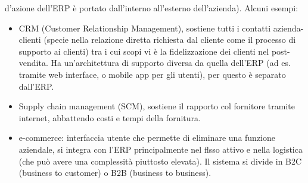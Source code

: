 d'azione dell'ERP \`e portato dall'interno all'esterno dell'azienda). Alcuni esempi:
\begin{itemize}
  \item CRM (Customer Relationship Management), sostiene tutti i contatti azienda-clienti (specie nella relazione diretta richiesta dal cliente
  come il processo di supporto ai clienti) tra i cui scopi vi \`e la fidelizzazione dei clienti
  nel post-vendita. Ha un'architettura di supporto diversa da quella dell'ERP (ad es. tramite web interface, o mobile app per gli utenti),
  per questo \`e separato dall'ERP.
  \item Supply chain management (SCM), sostiene il rapporto col fornitore tramite internet,
  abbattendo costi e tempi della fornitura.
  \item e-commerce: interfaccia utente che permette di eliminare una funzione aziendale, si integra con l'ERP
  principalmente nel flsso attivo e nella logistica (che pu\`o avere una complessit\`a piuttosto elevata).
  Il sistema si divide in B2C (business to customer) o B2B (business to business).
\end{itemize}
